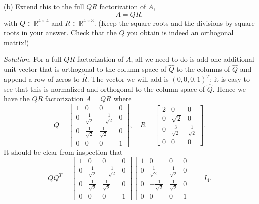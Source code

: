 \documentclass{article}
\newcommand{\R}{\mathbb{R}}
\begin{document}
\vspace{5mm}

(b) Extend this to the full $QR$ factorization of $A$,
%
\begin{equation*}
    A = QR,
\end{equation*}
%
with $Q \in \R^{4 \times 4}$ and $R \in \R^{4 \times 3}$. (Keep the square
roots and the divisions by square roots in your answer. Check that the $Q$
you obtain is indeed an orthogonal matrix!)

\textit{Solution.}
For a full $QR$ factorization of $A$, all we need to do is add one additional
unit vector that is orthogonal to the column space of $\widehat{Q}$ to the
columns of $\widehat{Q}$ and append a row of zeros to $\widehat{R}$. The vector
we will add is $(0, 0, 0, 1)^T$; it is easy to see that this is normalized
and orthogonal to the column space of $\widehat{Q}$. Hence we have the $QR$ factorization
$A = QR$ where
%
\begin{equation*}
    Q =
    \begin{bmatrix}
        1 & 0 & 0 & 0 \\
        0 & \frac{1}{\sqrt{2}} & - \frac{1}{\sqrt{2}} & 0\\
        0 & \frac{1}{\sqrt{2}} & \frac{1}{\sqrt{2}} & 0 \\
        0 & 0 & 0 & 1
    \end{bmatrix},
    \quad
    R =
    \begin{bmatrix}
        2 & 0 & 0 \\
        0 & \sqrt{2} & 0 \\
        0 & \frac{3}{\sqrt{2}} & \frac{1}{\sqrt{2}} \\
        0 & 0 & 0
    \end{bmatrix}
    .
\end{equation*}
%
It should be clear from inspection that
%
\begin{equation*}
    Q Q^T = 
    \begin{bmatrix}
        1 & 0 & 0 & 0 \\
        0 & \frac{1}{\sqrt{2}} & - \frac{1}{\sqrt{2}} & 0\\
        0 & \frac{1}{\sqrt{2}} & \frac{1}{\sqrt{2}} & 0 \\
        0 & 0 & 0 & 1
    \end{bmatrix}
    \begin{bmatrix}
        1 & 0 & 0 & 0 \\
        0 & \frac{1}{\sqrt{2}} & \frac{1}{\sqrt{2}} & 0\\
        0 & - \frac{1}{\sqrt{2}} & \frac{1}{\sqrt{2}} & 0 \\
        0 & 0 & 0 & 1
    \end{bmatrix}
    =
    I_4
    .
\end{equation*}
\end{document}
